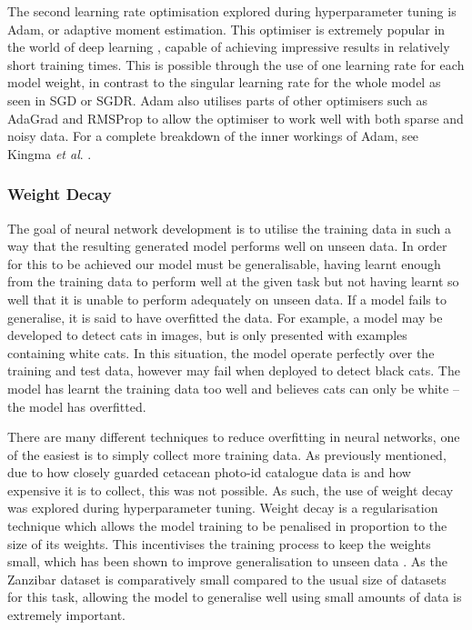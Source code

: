 The second learning rate optimisation explored during hyperparameter tuning is Adam, or adaptive moment estimation. This optimiser is extremely popular in the world of deep learning \cite{karpathy_peek_2017}, capable of achieving impressive results in relatively short training times. This is possible through the use of one learning rate for each model weight, in contrast to the singular learning rate for the whole model as seen in SGD or SGDR. Adam also utilises parts of other optimisers such as AdaGrad \cite{duchi_adaptive_2011} and RMSProp \cite{tieleman_lecture_2012} to allow the optimiser to work well with both sparse and noisy data. For a complete breakdown of the inner workings of Adam, see Kingma \textit{et al}. \cite{kingma_adam:_2014}. 

\subsubsection{Weight Decay}\label{ch:cetDet,sec:ModelSelection,sub:TrainingHyperparameters,subsub:WeightDecay}

The goal of neural network development is to utilise the training data in such a way that the resulting generated model performs well on unseen data. In order for this to be achieved our model must be generalisable, having learnt enough from the training data to perform well at the given task but not having learnt so well that it is unable to perform adequately on unseen data. If a model fails to generalise, it is said to have overfitted the data. For example, a model may be developed to detect cats in images, but is only presented with examples containing white cats. In this situation, the model operate perfectly over the training and test data, however may fail when deployed to detect black cats. The model has learnt the training data too well and believes cats can only be white -- the model has overfitted. 

There are many different techniques to reduce overfitting in neural networks, one of the easiest is to simply collect more training data. As previously mentioned, due to how closely guarded cetacean photo-id catalogue data is and how expensive it is to collect, this was not possible. As such, the use of weight decay was explored during hyperparameter tuning. Weight decay is a regularisation technique which allows the model training to be penalised in proportion to the size of its weights. This incentivises the training process to keep the weights small, which has been shown to improve generalisation to unseen data \cite{krogh_simple_1991}. As the Zanzibar dataset is comparatively small compared to the usual size of datasets for this task, allowing the model to generalise well using small amounts of data is extremely important.

